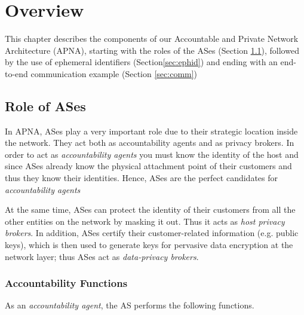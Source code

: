 
\chapter{Overview} %

\label{overview} %
This chapter describes the components of our Accountable and Private Network Architecture (APNA), starting with the roles of the ASes (Section \ref{sec:role_as}), followed by the use of ephemeral identifiers (Section\ref{sec:ephid}) and ending with an end-to-end communication example (Section \ref{sec:comm})

\section{Role of ASes} \label{sec:role_as}
In APNA, ASes play a very important role due to their strategic location inside the network. They act both as accountability agents and as privacy brokers. In order to act as \textit{accountability agents} you must know the identity of the host and since ASes already know the physical attachment point of their customers and thus they know their identities. Hence, ASes are the perfect candidates for  \textit{accountability agents} 

At the same time, ASes can protect the identity of their customers from all the other entities on the network by masking it out. Thus it acts as \textit{host privacy brokers}. In addition, ASes certify their customer-related information (e.g. public keys), which is then used to generate keys for pervasive data encryption at the network layer; thus ASes act as \textit{data-privacy brokers}.

\subsection{Accountability Functions}
As an \textit{accountability agent}, the AS performs the following functions.

